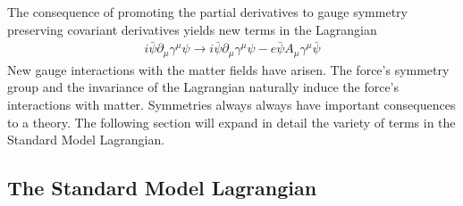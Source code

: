 The consequence of promoting the partial derivatives to gauge symmetry preserving covariant derivatives yields new terms in the Lagrangian
\begin{align*}
i\bar{\psi} \partial_\mu\gamma^\mu \psi  \rightarrow i\bar{\psi} \partial_\mu\gamma^\mu \psi - e\bar{\psi} A_\mu \gamma^\mu \bar{\psi}
\end{align*}
New gauge interactions with the matter fields have arisen. The force's symmetry group and the invariance of the Lagrangian
naturally induce the force's interactions with matter. Symmetries always always have important consequences to a 
theory. The following section will expand in detail the variety of terms in the Standard Model Lagrangian.

\subsection{The Standard Model Lagrangian}

